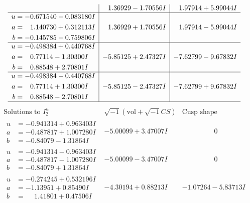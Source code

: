 \documentclass[1p]{elsarticle_modified}
\theoremstyle{definition}
\newcommand{\I}{\sqrt{-1}}
\begin{document}
$$\begin{array}{c|c|c}
 & \phantom{-}1.36929 - 1.70556 I & \phantom{-}1.97914 + 5.99044 I \\ \hline\begin{aligned}
u &= -0.671540 - 0.083180 I \\
a &= \phantom{-}1.140730 + 0.312113 I \\
b &= -0.145785 - 0.759806 I\end{aligned}
 & \phantom{-}1.36929 + 1.70556 I & \phantom{-}1.97914 - 5.99044 I \\ \hline\begin{aligned}
u &= -0.498384 + 0.440768 I \\
a &= \phantom{-}0.77114 - 1.30300 I \\
b &= \phantom{-}0.88548 + 2.70801 I\end{aligned}
 & -5.85125 + 2.47327 I & -7.62799 - 9.67832 I \\ \hline\begin{aligned}
u &= -0.498384 - 0.440768 I \\
a &= \phantom{-}0.77114 + 1.30300 I \\
b &= \phantom{-}0.88548 - 2.70801 I\end{aligned}
 & -5.85125 - 2.47327 I & -7.62799 + 9.67832 I\\
 \hline 
 \end{array}$$\newpage$$\begin{array}{c|c|c}  
\text{Solutions to }I^u_{2}& \I (\text{vol} + \sqrt{-1}CS) & \text{Cusp shape}\\
 \hline 
\begin{aligned}
u &= -0.941314 + 0.963403 I \\
a &= -0.487817 + 1.007280 I \\
b &= -0.84079 - 1.31864 I\end{aligned}
 & -5.00099 + 3.47007 I & \phantom{-0.000000 } 0 \\ \hline\begin{aligned}
u &= -0.941314 - 0.963403 I \\
a &= -0.487817 - 1.007280 I \\
b &= -0.84079 + 1.31864 I\end{aligned}
 & -5.00099 - 3.47007 I & \phantom{-0.000000 } 0 \\ \hline\begin{aligned}
u &= -0.274245 + 0.532196 I \\
a &= -1.13951 + 0.85490 I \\
b &= \phantom{-}1.41801 + 0.47506 I\end{aligned}
 & -4.30194 + 0.88213 I & -1.07264 - 5.83713 I \\ \hline\begin{aligned}

\end{aligned}
\end{array}$$
\end{document}
